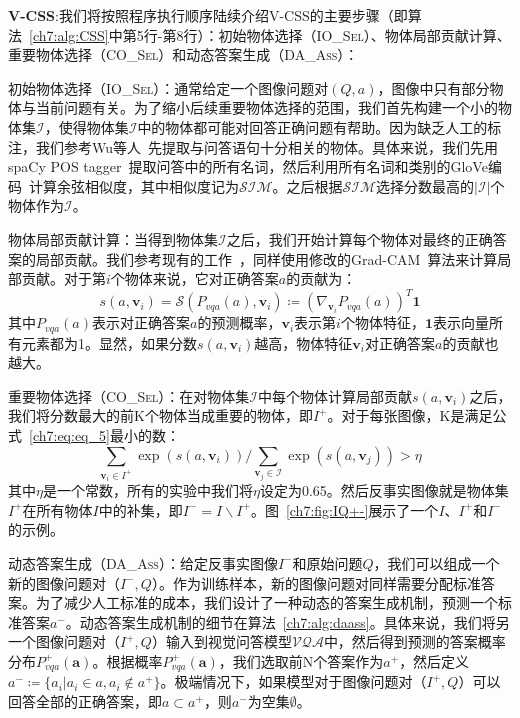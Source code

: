 \textbf{V-CSS}:我们将按照程序执行顺序陆续介绍V-CSS的主要步骤（即算法~\ref{ch7:alg:CSS}中第5行-第8行）：初始物体选择（\textsc{IO\_Sel}）、物体局部贡献计算、重要物体选择（\textsc{CO\_Sel}）和动态答案生成（\textsc{DA\_Ass}）：

初始物体选择（\textsc{IO\_Sel}）：通常给定一个图像问题对$(Q, a)$，图像中只有部分物体与当前问题有关。为了缩小后续重要物体选择的范围，我们首先构建一个小的物体集$\mathcal{I}$，使得物体集$\mathcal{I}$中的物体都可能对回答正确问题有帮助。因为缺乏人工的标注，我们参考Wu等人~\cite{wu2019self}先提取与问答语句十分相关的物体。具体来说，我们先用spaCy POS tagger~\cite{honnibal2017spacy}提取问答中的所有名词，然后利用所有名词和类别的GloVe编码~\cite{pennington2014glove}计算余弦相似度，其中相似度记为$\mathcal{SIM}$。之后根据$\mathcal{SIM}$选择分数最高的$|\mathcal{I}|$个物体作为$\mathcal{I}$。

物体局部贡献计算：当得到物体集$\mathcal{I}$之后，我们开始计算每个物体对最终的正确答案的局部贡献。我们参考现有的工作~\cite{jain2019attention,selvaraju2019taking,wu2019self}，同样使用修改的Grad-CAM~\cite{selvaraju2017grad}算法来计算局部贡献。对于第$i$个物体来说，它对正确答案$a$的贡献为：
\begin{equation} \label{ch7:eq:eq_4}
s(a, \bm{v}_i) = \mathcal{S}(P_{vqa}(a), \bm{v}_i) \coloneqq (\nabla_{\bm{v}_i} P_{vqa}(a))^T\mathbf{1}
\end{equation}
其中$P_{vqa}(a)$表示对正确答案$a$的预测概率，$\bm{v}_i$表示第$i$个物体特征，$\mathbf{1}$表示向量所有元素都为1。显然，如果分数$s(a, \bm{v}_i)$越高，物体特征$\bm{v}_i$对正确答案$a$的贡献也越大。

重要物体选择（\textsc{CO\_Sel}）：在对物体集$\mathcal{I}$中每个物体计算局部贡献$s(a, \bm{v}_i)$之后，我们将分数最大的前K个物体当成重要的物体，即$I^+$。对于每张图像，K是满足公式~\eqref{ch7:eq:eq_5}最小的数：
\begin{equation} \label{ch7:eq:eq_5}
\sum_{\bm{v}_i \in I^+} \exp(s(a, \bm{v}_i)) / \sum_{\bm{v}_j \in \mathcal{I}} \exp(s(a, \bm{v}_j))  > \eta
\end{equation}
其中$\eta$是一个常数，所有的实验中我们将$\eta$设定为0.65。然后反事实图像就是物体集$I^+$在所有物体$I$中的补集，即$I^- = I \backslash I^+$。图~\ref{ch7:fig:IQ+-}展示了一个$I$、$I^+$和$I^-$的示例。

动态答案生成（\textsc{DA\_Ass}）：给定反事实图像$I^-$和原始问题$Q$，我们可以组成一个新的图像问题对（$I^-, Q$）。作为训练样本，新的图像问题对同样需要分配标准答案。为了减少人工标准的成本，我们设计了一种动态的答案生成机制，预测一个标准答案$a^-$。动态答案生成机制的细节在算法~\ref{ch7:alg:daass}。具体来说，我们将另一个图像问题对（$I^+, Q$）输入到视觉问答模型$\mathcal{VQA}$中，然后得到预测的答案概率分布$P^+_{vqa}(\bm{a})$。根据概率$P^+_{vqa}(\bm{a})$，我们选取前N个答案作为$a^+$，然后定义$ a^- \coloneqq \{a_i | a_i \in a, a_i \notin a^+ \}$。极端情况下，如果模型对于图像问题对（$I^+, Q$）可以回答全部的正确答案，即$a \subset a^+$，则$a^-$为空集$\emptyset$。

